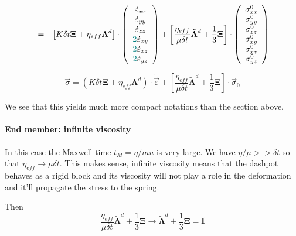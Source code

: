 \begin{eqnarray}
&=& 
\left[
K \delta t {\bm \Xi}
+
\eta_{eff} {\bm \Lambda}^d
\right]
\cdot
\left(
\begin{array}{c}
\dot\varepsilon_{xx}\\ 
\dot\varepsilon_{yy}\\ 
\dot\varepsilon_{zz}\\ 
{\color{teal}2}\dot\varepsilon_{xy} \\ 
{\color{teal}2}\dot\varepsilon_{xz} \\ 
{\color{teal}2}\dot\varepsilon_{yz}
\end{array}
\right) 
+ 
\left[
\frac{\eta_{eff}}{\mu\delta t}
\tilde{\bm\Lambda}^d
+
\frac13 {\bm \Xi}
\right]
\cdot
\left(
\begin{array}{c}
\sigma_{xx}^0\\ 
\sigma_{yy}^0\\ 
\sigma_{zz}^0\\ 
\sigma_{xy}^0 \\
\sigma_{xz}^0 \\
\sigma_{yz}^0
\end{array}
\right) 
\label{simpson3D_b}
\end{eqnarray}







\begin{mdframed}[backgroundcolor=blue!5]
\[
\vec\sigma = 
\left(
K \delta t {\bm \Xi}
+
\eta_{eff} {\bm \Lambda}^d
\right)
\cdot
\dot{\vec{\varepsilon}}
+
\left[
\frac{\eta_{eff}}{\mu\delta t}
\tilde{\bm\Lambda}^d
+
\frac13 {\bm \Xi}
\right]
\cdot
\vec\sigma_0
\]
\end{mdframed}

We see that this yields much more compact notations
than the section above.



\paragraph{End member: infinite viscosity}
In this case the Maxwell time $t_M=\eta/mu$ is very large.
We have $\eta/\mu >> \delta t$ so that $\eta_{eff} 
\rightarrow \mu \delta t$. This makes sense, infinite 
viscosity means that the dashpot behaves as a rigid block 
and its viscosity will not play a role in the deformation
and it'll propagate the stress to the spring.

Then 
\[
\frac{\eta_{eff}}{\mu \delta t} \tilde{\bm\Lambda}^d + 
\frac13 {\bm\Xi} 
\rightarrow
\tilde{\bm\Lambda}^d + 
\frac13 {\bm\Xi} 
=
{\bm I}
\]

